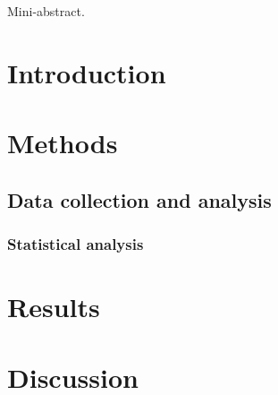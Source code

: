 \begin{framed}
Mini-abstract.
\end{framed}

\newpage
\section{Introduction}
\lipsum[8]

\section{Methods}

\subsection{Data collection and analysis}

\subsubsection{Statistical analysis}

\section{Results}

\clearpage
\section{Discussion}
\lipsum[5][]
